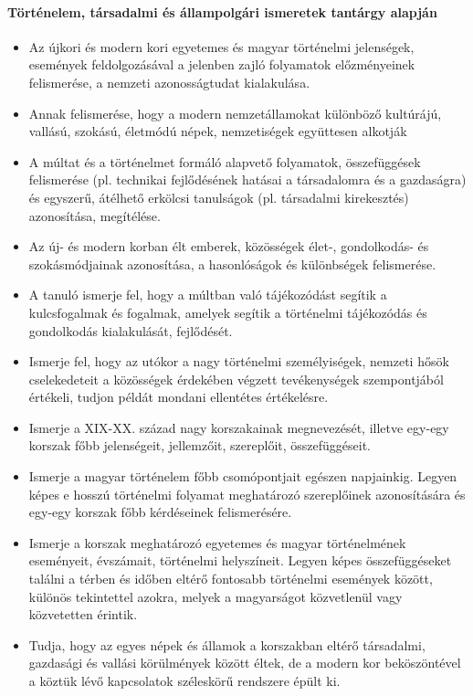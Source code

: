 \paragraph{Történelem, társadalmi és állampolgári ismeretek tantárgy alapján}
\begin{itemize}
\item Az újkori és modern kori egyetemes és magyar történelmi jelenségek, események feldolgozásával a jelenben zajló folyamatok előzményeinek felismerése, a nemzeti azonosságtudat kialakulása.
\item Annak felismerése, hogy a modern nemzetállamokat különböző kultúrájú, vallású, szokású, életmódú népek, nemzetiségek együttesen alkotják
\item A múltat és a történelmet formáló alapvető folyamatok, összefüggések felismerése (pl. technikai fejlődésének hatásai a társadalomra és a gazdaságra) és egyszerű, átélhető erkölcsi tanulságok (pl. társadalmi kirekesztés) azonosítása, megítélése.
\item Az új- és modern korban élt emberek, közösségek élet-, gondolkodás- és szokásmódjainak azonosítása, a hasonlóságok és különbségek felismerése.
\item A tanuló ismerje fel, hogy a múltban való tájékozódást segítik a kulcsfogalmak és fogalmak, amelyek segítik a történelmi tájékozódás és gondolkodás kialakulását, fejlődését.
\item Ismerje fel, hogy az utókor a nagy történelmi személyiségek, nemzeti hősök cselekedeteit a közösségek érdekében végzett tevékenységek szempontjából értékeli, tudjon példát mondani ellentétes értékelésre.
\item Ismerje a XIX-XX. század nagy korszakainak megnevezését, illetve egy-egy korszak főbb jelenségeit, jellemzőit, szereplőit, összefüggéseit.
\item Ismerje a magyar történelem főbb csomópontjait egészen napjainkig. Legyen képes e hosszú történelmi folyamat meghatározó szereplőinek azonosítására és egy-egy korszak főbb kérdéseinek felismerésére.
\item Ismerje a korszak meghatározó egyetemes és magyar történelmének eseményeit, évszámait, történelmi helyszíneit. Legyen képes összefüggéseket találni a térben és időben eltérő fontosabb történelmi események között, különös tekintettel azokra, melyek a magyarságot közvetlenül vagy közvetetten érintik.
\item Tudja, hogy az egyes népek és államok a korszakban eltérő társadalmi, gazdasági és vallási körülmények között éltek, de a modern kor beköszöntével a köztük lévő kapcsolatok széleskörű rendszere épült ki.

\end{itemize}
